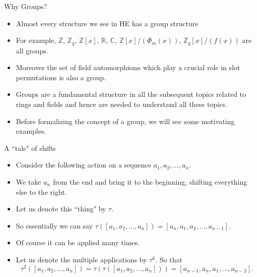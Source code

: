 \documentclass[ %
 10pt, xcolor={dvipsnames,svgnames,x11names,hyperref},
   hyperref={colorlinks=true,citecolor=green,linkcolor=DarkRed,urlcolor=ProcessBlue,anchorcolor=blue}
  ]{beamer}
\newenvironment{stepitemize}{\begin{itemize}[<+->]}{\end{itemize} }
\newcommand{\Z}{\mathbb{Z}}
\newcommand{\R}{\mathbb{R}}
\newcommand{\C}{\mathbb{C}}
\begin{document}
\begin{frame}{Why Groups?}
\begin{stepitemize}
    \item Almost every structure we see in HE has a group structure
    \item For example, $\Z$, $\Z_q$, $\Z[x]$, $\R$, $\C$, $\Z[x]/(\Phi_m(x))$, $\Z_q[x]/(f(x))$ are all groups.
    \item Moreover the set of field automorphisms which play a crucial role in slot permutations is also a group.
    \item Groups are a fundamental structure in all the subsequent topics related to rings and fields and hence are needed to understand all these topics.
    \item Before formalizing the concept of a group, we will see some motivating examples.
\end{stepitemize}
\end{frame}

\begin{frame}{A ``tale" of shifts}
\begin{stepitemize}
    \item  Consider the following action on a sequence $a_1, a_2, \dots, a_n$.
    \item We take $a_n$ from the end and bring it to the beginning, shifting everything else to the right.
    \item Let us denote this ``thing" by $\tau$.
    \item So essentially we can say $\tau([a_1, a_2, \dots, a_n]) = [a_n, a_1, a_2, \dots, a_{n-1}]$.
    \item Of course it can be applied many times.
    \item Let us denote the multiple applications by $\tau^k$. So that
    $$\tau^2([a_1, a_2, \dots, a_n]) = \tau(\tau([a_1, a_2, \dots, a_n]))=[a_{n-1},a_{n},a_1, \dots, a_{n-2}].$$
\end{stepitemize}
\end{frame}
\end{document}
